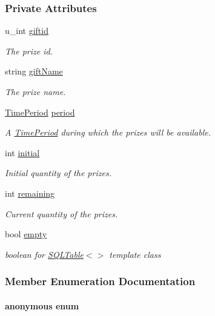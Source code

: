 \subsubsection*{Private Attributes}
\begin{CompactItemize}
\item 
u\_\-int \hyperlink{classgiftDetails_giftDetailso0}{giftid}
\begin{CompactList}\small\item\em The prize id.\item\end{CompactList}\item 
string \hyperlink{classgiftDetails_giftDetailso1}{gift\-Name}
\begin{CompactList}\small\item\em The prize name.\item\end{CompactList}\item 
\hyperlink{classTimePeriod}{Time\-Period} \hyperlink{classgiftDetails_giftDetailso2}{period}
\begin{CompactList}\small\item\em A \hyperlink{classTimePeriod}{Time\-Period} during which the prizes will be available.\item\end{CompactList}\item 
int \hyperlink{classgiftDetails_giftDetailso3}{initial}
\begin{CompactList}\small\item\em Initial quantity of the prizes.\item\end{CompactList}\item 
int \hyperlink{classgiftDetails_giftDetailso4}{remaining}
\begin{CompactList}\small\item\em Current quantity of the prizes.\item\end{CompactList}\item 
bool \hyperlink{classgiftDetails_giftDetailso5}{empty}
\begin{CompactList}\small\item\em boolean for \hyperlink{classSQLTable}{SQLTable}$<$$>$ template class\item\end{CompactList}\end{CompactItemize}


\subsubsection{Member Enumeration Documentation}
\hypertarget{classgiftDetails_giftDetailss7}{
\paragraph["@6]{\setlength{\rightskip}{0pt plus 5cm}anonymous enum}\hfill}
\label{classgiftDetails_giftDetailss7}


